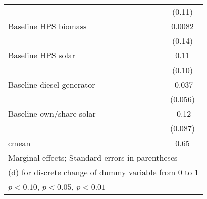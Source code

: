 \begin{table}[htbp]
\begin{tabular*}{1\hsize}{@{\hskip\tabcolsep\extracolsep\fill}l*{5}{c}}
                &                  &                  &                  &                  &   (0.11)         \\
Baseline HPS biomass&                  &                  &                  &                  &   0.0082         \\
                &                  &                  &                  &                  &   (0.14)         \\
Baseline HPS solar&                  &                  &                  &                  &     0.11         \\
                &                  &                  &                  &                  &   (0.10)         \\
Baseline diesel generator&                  &                  &                  &                  &   -0.037         \\
                &                  &                  &                  &                  &  (0.056)         \\
Baseline own/share solar&                  &                  &                  &                  &    -0.12         \\
                &                  &                  &                  &                  &  (0.087)         \\
\midrule
cmean           &                  &                  &                  &                  &     0.65         \\
\bottomrule
\multicolumn{6}{l}{\footnotesize Marginal effects; Standard errors in parentheses}\\
\multicolumn{6}{l}{\footnotesize  (d) for discrete change of dummy variable from 0 to 1}\\
\multicolumn{6}{l}{\footnotesize \sym{*} \(p<0.10\), \sym{**} \(p<0.05\), \sym{***} \(p<0.01\)}\\
\end{tabular*}
\end{table}
